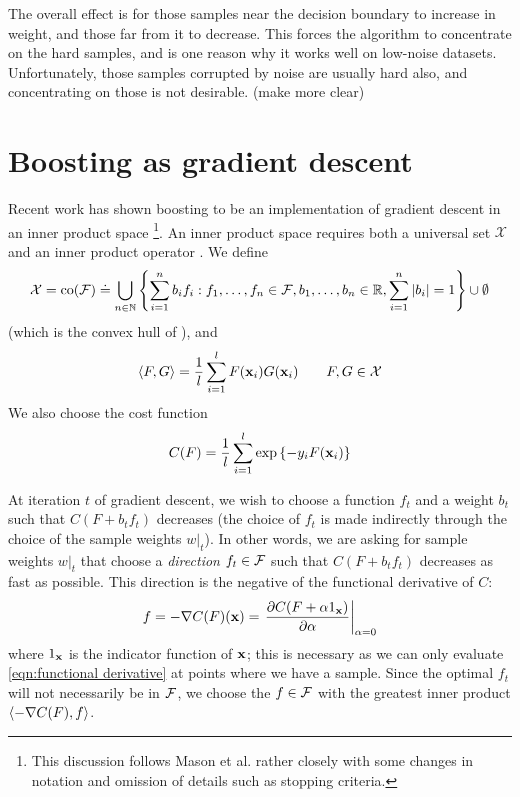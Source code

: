 The overall effect is for those samples near the decision boundary to
increase in weight, and those far from it to decrease.  This forces
the algorithm to concentrate on the hard samples, and is one reason
why it works well on low-noise datasets.  Unfortunately, those samples
corrupted by noise are usually hard also, and concentrating on those
is not desirable. (make more clear)


\section{Boosting as gradient descent}
\label{sec:theory:gradient descent}

Recent work has shown boosting to be an implementation of gradient
descent in an inner product space \cite{Mason99}\footnote{This
discussion follows Mason et al. \cite{Mason99} rather closely with
some changes in notation and omission of details such as stopping
criteria.}.
An inner product space requires both a universal set
$\mathcal{X}$ and an inner product operator \ip{\cdot}{\cdot}.  We
define
%
\begin{equation}
\mathcal{X} = 
\mathrm{co} (\mathcal{F}) \doteq
 \bigcup _{n \in \mathbb{N}}
\left\{
 \sum_{i=1}^{n}
  b_i
f_i : f_1, \ldots, f_n \in \mathcal{F},
 b_1, \ldots, b_n \in \mathbb{R},
 \sum_{i=1}^{n} | b_i | = 1
\right\} \cup \emptyset
\end{equation}
%
(which is the convex hull of \calF), and
%
\begin{equation}
\langle {F} , {G} \rangle = \frac{1}{l} \sum_{i=1}^{l} F(\mathbf{x}_i)G(\mathbf{x}_i) \qquad
F, G \in \mathcal{X}
\end{equation}
%
We also choose the cost function
%
\begin{equation}
C(F) = \frac{1}{l} \sum_{i=1}^{l} \exp
\left\{ -y_i F(\mathbf{x}_i) \right\}
\label{eqn:theory:cost function}
\end{equation}

At iteration $t$ of gradient descent, we wish to choose a function $f_t$ and
a weight $b_t$ such that $C(F + b_t f_t)$ decreases (the choice of
$f_t$ is made indirectly through the choice of the sample weights
$w|_t$).  In other words, we are asking for sample weights $w|_t$ that
choose a \emph{direction} $f_t \in \mathcal{F}$ such that $C(F + b_t f_t)$
decreases as fast as possible.  This direction is the negative of the
functional derivative of $C$:
%
\begin{equation}
f = -\nabla C(F)(\mathbf{x}) = \left. \frac{\partial C(F + \alpha
1_{\mathbf{x}})}{\partial \alpha} \right|_{\alpha = 0}
\label{eqn:functional derivative}
\end{equation}
%
where $1_{\mathbf{x}}$ is the indicator function of $\mathbf{x}$; this is
necessary as we can only evaluate \ref{eqn:functional derivative} at
points where we have a sample.  Since the
optimal $f_t$ will not necessarily be in $\mathcal{F}$, we choose the
$f \in \mathcal{F}$ with the greatest inner product $\langle {-\nabla
C(F)} , {f} \rangle$.

